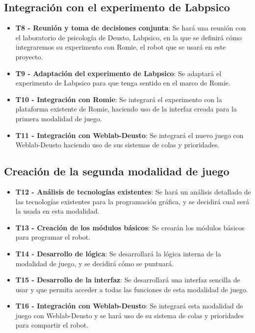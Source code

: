 \subsection{Integración con el experimento de Labpsico}

\begin{itemize}
\item \textbf{T8 - Reunión y toma de decisiones conjunta}: Se hará una reunión con el laboratorio de
psicología de Deusto, Labpsico, en la que se definirá cómo integraremos su experimento con Romie, el
robot que se usará en este proyecto.

\item \textbf{T9 - Adaptación del experimento de Labpsico}: Se adaptará el experimento de Labpsico
para que tenga sentido en el marco de Romie.

\item \textbf{T10 - Integración con Romie}: Se integrará el experimento con la plataforma existente
de Romie, haciendo uso de la interfaz creada para la primera modalidad de juego.

\item \textbf{T11 - Integración con Weblab-Deusto}: Se integrará el nuevo juego con Weblab-Deusto
haciendo uso de sus sistemas de colas y prioridades.
\end{itemize}

\subsection{Creación de la segunda modalidad de juego}

\begin{itemize}
\item \textbf{T12 - Análisis de tecnologías existentes}: Se hará un análisis detallado de las
tecnologías existentes para la programación gráfica, y se decidirá cual será la usada en esta
modalidad.

\item \textbf{T13 - Creación de los módulos básicos}: Se crearán los módulos básicos para programar
el robot.

\item \textbf{T14 - Desarrollo de lógica}: Se desarrollará la lógica interna de la modalidad de
juego, y se decidirá cómo se puntuará.

\item \textbf{T15 - Desarrollo de la interfaz}: Se desarrollará una interfaz sencilla de usar y que
permita acceder a todas las funciones de esta modalidad de juego.

\item \textbf{T16 - Integración con Weblab-Deusto}: Se integrará esta modalidad de juego con
Weblab-Deusto y se hará uso de su sistema de colas y prioridades para compartir el robot.
\end{itemize}

